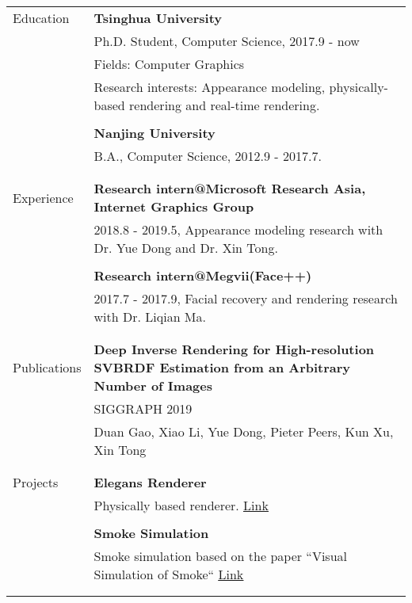 \documentclass[letterpaper,11pt,oneside]{article}
\begin{document}
\noindent \begin{tabular}{@{} l l}
 \Large{Education}    & \textbf{Tsinghua University} \\
     & Ph.D. Student, Computer Science, 2017.9 - now \\
     & Fields:  Computer Graphics\\
      & \parbox{5.0in}{ Research interests: Appearance modeling, physically-based rendering and real-time rendering.} \\
     & \\
     & \textbf{Nanjing University} \\
     & B.A., Computer Science, 2012.9 - 2017.7. \\
     & \\
     & \\
 \Large{Experience}    & \textbf{Research intern@Microsoft Research Asia, Internet Graphics Group} \\
    & \parbox{5.0in}{ 2018.8 - 2019.5, Appearance modeling research with Dr. Yue Dong and Dr. Xin Tong.}\\
    & \\
    & \textbf{Research intern@Megvii(Face++)} \\
    & \parbox{5.0in}{2017.7 - 2017.9, Facial recovery and rendering research with Dr. Liqian Ma.}\\
    & \\
     & \\
 \Large{Publications} 
     & \parbox{5.0in}{\textbf{Deep Inverse Rendering for High-resolution SVBRDF Estimation from an Arbitrary Number of Images}} \\
     & \parbox{5.0in}{SIGGRAPH 2019} \\
     & \parbox{5.0in}{Duan Gao, Xiao Li, Yue Dong, Pieter Peers, Kun Xu, Xin Tong} \\
     & \\
  & \\

\Large{Projects}   & \textbf{Elegans Renderer}\\
   & \parbox{5.0in}{Physically based renderer. \hfill \href{https://github.com/gao-duan/Elegans}{\underline{Link}}} \\
   & \\
   & \textbf{Smoke Simulation}\\
   & \parbox{5.0in}{Smoke simulation based on the paper ``Visual Simulation of Smoke`` \hfill \href{https://github.com/gao-duan/SmokeSimulation}{\underline{Link}}} \\
   & \\
   & \\
    


\end{tabular}
\end{document}
